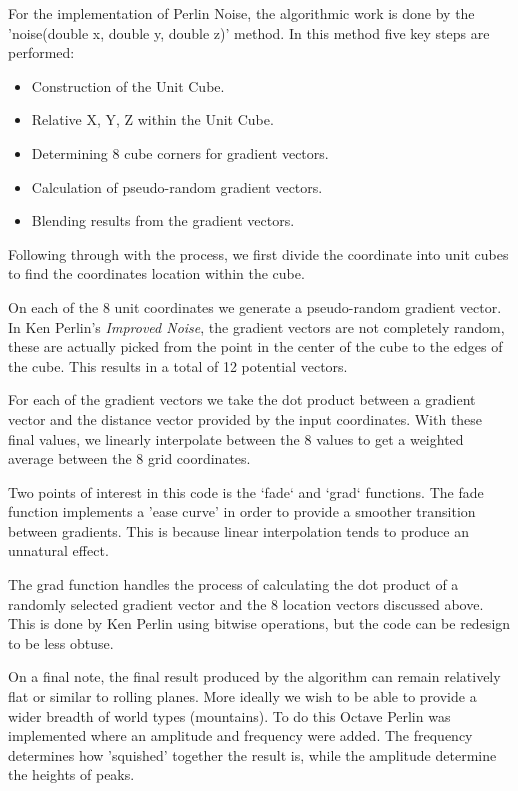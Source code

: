 \documentclass{book}
\begin{document}
For the implementation of Perlin Noise, the algorithmic work is done by the 'noise(double x, double y, double z)' method.  In this method five key steps are performed:
    
\begin{itemize}
	\item Construction of the Unit Cube.
	\item Relative X, Y, Z within the Unit Cube.
	\item Determining 8 cube corners for gradient vectors.
	\item Calculation of pseudo-random gradient vectors.
	\item Blending results from the gradient vectors.
\end{itemize}
  
Following through with the process, we first divide the coordinate into unit cubes to find the coordinates location within the cube.
    
On each of the 8 unit coordinates we generate a pseudo-random gradient vector.  In Ken Perlin's \textit{Improved Noise}, the gradient vectors are not completely random, these are actually picked from the point in the center of the cube to the edges of the cube.  This results in a total of 12 potential vectors.
    
For each of the gradient vectors we take the dot product between a gradient vector and the distance vector provided by the input coordinates.  With these final values, we linearly interpolate between the 8 values to get a weighted average between the 8 grid coordinates.  
    
Two points of interest in this code is the `fade` and `grad` functions.  The fade function implements a 'ease curve' in order to provide a smoother transition between gradients.  This is because linear interpolation tends to produce an unnatural effect.
    
The grad function handles the process of calculating the dot product of a randomly selected gradient vector and the 8 location vectors discussed above.  This is done by Ken Perlin using bitwise operations, but the code can be redesign to be less obtuse.
    
On a final note, the final result produced by the algorithm can remain relatively flat or similar to rolling planes.  More ideally we wish to be able to provide a wider breadth of world types (mountains).  To do this Octave Perlin was implemented where an amplitude and frequency were added.  The frequency determines how 'squished' together the result is, while the amplitude determine the heights of peaks.
    
\end{document}
